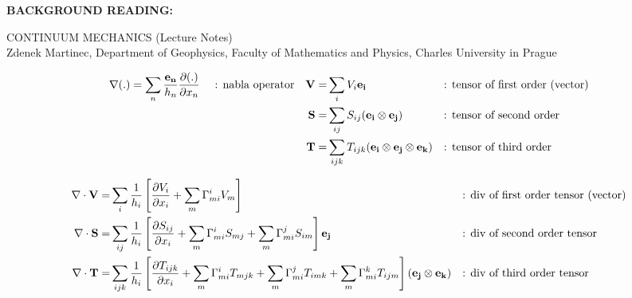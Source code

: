 \documentclass[11pt]{article}
\begin{document}
\begin{landscape}
\maketitle

\noindent
{\bf{BACKGROUND READING:}} \\

\vspace{0.3cm}

\noindent
CONTINUUM MECHANICS (Lecture Notes) \\
Zdenek Martinec, Department of Geophysics, Faculty of Mathematics and Physics, Charles University in Prague 




\begin{align}
\nabla (.) = \sum_n \frac{{\bf{e_n}}}{h_n}\frac{\partial (.)}{\partial x_n} \ \ \ \ \mbox{: nabla operator} & & {\bf{V}} = &  \sum_i V_i {\bf{{e_i}}} & & \mbox{: tensor of first order (vector)}\\
& & {\bf{S}} = &  \sum_{ij} S_{ij} ({\bf{e_i}} \otimes {\bf{e_j}}) & & {\mbox{: tensor of second order}}\\
& & {\bf{T}} = &  \sum_{ijk} T_{ijk} ({\bf{e_i}} \otimes {\bf{e_j}} \otimes {\bf{e_k}}) & & \mbox{: tensor of third order}
\end{align}

\begin{align}
\nabla \cdot {\bf{V}} = & \sum_i \frac{1}{h_i} \left[ \frac{\partial V_i}{\partial x_i} + \sum_m \Gamma_{mi}^i V_m \right] & & \mbox{: div of first order tensor (vector)} \\
\nabla \cdot {\bf{S}} = & \sum_{ij} \frac{1}{h_i} \left[ \frac{\partial S_{ij}}{\partial x_i} + \sum_m \Gamma_{mi}^i S_{mj} + \sum_m \Gamma_{mi}^j S_{im} \right] {\bf{e_j}} & & \mbox{: div of second order tensor} \\
\nabla \cdot {\bf{T}} = & \sum_{ijk} \frac{1}{h_i} \left[ \frac{\partial T_{ijk}}{\partial x_i} + \sum_m \Gamma_{mi}^i T_{mjk} + \sum_m \Gamma_{mi}^j T_{imk} + \sum_m \Gamma_{mi}^k T_{ijm} \right]  ({\bf{e_j}} \otimes {\bf{e_k}}) & & \mbox{: div of third order tensor}
\end{align}


\end{landscape}
\end{document}

